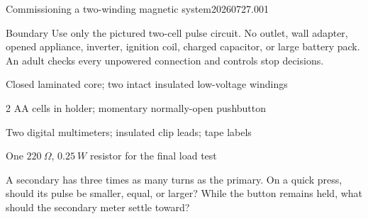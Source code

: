 

  {Commissioning a two-winding magnetic system}{20260727.001}



\begin{teloshazard}{Boundary}
Use only the pictured two-cell pulse circuit. No outlet, wall adapter, opened
appliance, inverter, ignition coil, charged capacitor, or large battery pack.
An adult checks every unpowered connection and controls stop decisions.
\end{teloshazard}

\begin{materials}
\item Closed laminated core; two intact insulated low-voltage windings
\item 2 AA cells in holder; momentary normally-open pushbutton
\item Two digital multimeters; insulated clip leads; tape labels
\item One \(\qty{220}{\Omega}\), \(\qty{0.25}{W}\) resistor for the final load test
\end{materials}

\begin{predict}
A secondary has three times as many turns as the primary. On a quick press,
should its pulse be smaller, equal, or larger? While the button remains held,
what should the secondary meter settle toward?
\end{predict}

